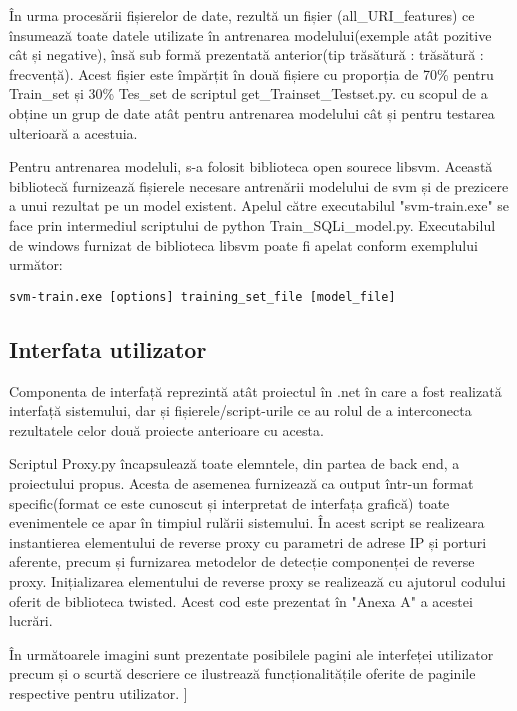 În urma procesării fișierelor de date, rezultă un fișier (all\_URI\_features)  ce însumează toate datele utilizate în antrenarea modelului(exemple atât pozitive cât și negative), însă sub formă prezentată anterior(tip trăsătură :  trăsătură : frecvență). Acest fișier este împărțit în două fișiere cu proporția  de 70\% pentru Train\_set și 30\% Tes\_set de scriptul get\_Trainset\_Testset.py.  cu scopul de a obține un grup de date atât pentru antrenarea modelului cât și pentru testarea ulterioară a acestuia. 

Pentru antrenarea modeluli, s-a folosit biblioteca open sourece libsvm. Această bibliotecă furnizează fișierele necesare antrenării modelului de svm și de prezicere a unui rezultat pe un model existent. Apelul către executabilul "svm-train.exe" se face prin intermediul scriptului de python  Train\_SQLi\_model.py.
Executabilul de windows furnizat de biblioteca libsvm poate fi apelat conform exemplului următor: 

\begin{lstlisting} 
svm-train.exe [options] training_set_file [model_file]
\end{lstlisting}

\subsection{Interfata utilizator}

 Componenta de interfață reprezintă atât proiectul în .net în care a fost realizată interfață sistemului, dar și fișierele/script-urile ce au rolul de a interconecta rezultatele celor două proiecte anterioare cu acesta. 

Scriptul Proxy.py încapsulează toate elemntele, din partea de back end, a proiectului propus. Acesta de asemenea furnizează ca output într-un format specific(format ce este cunoscut și interpretat de interfața grafică) toate evenimentele ce apar în timpiul rulării sistemului. În acest script se realizeara instantierea elementului de reverse proxy cu parametri de adrese IP și porturi aferente, precum și furnizarea metodelor de detecție componenței de reverse proxy. Inițializarea elementului de reverse proxy se realizează cu ajutorul codului oferit de biblioteca twisted. Acest cod este prezentat în "Anexa A" a acestei lucrări. 

În următoarele imagini sunt prezentate posibilele pagini ale interfeței utilizator precum și o scurtă descriere ce ilustrează funcționalitățile oferite de paginile respective pentru utilizator. 
\newpage]
 
